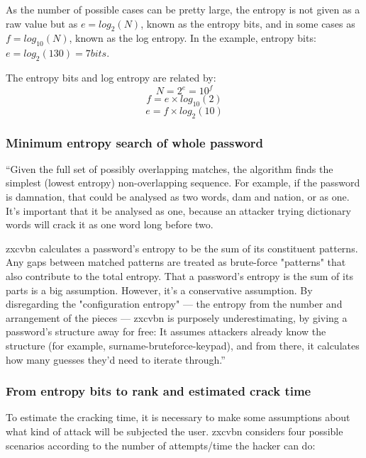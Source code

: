 As the number of possible cases can be pretty large, the entropy is not given as a raw value but as $e = log_{2}(N)$, known as the entropy bits, and in some cases as $f = log_{10}(N)$, known as the log entropy. In the example, entropy bits: $e = log_{2}(130) = 7 bits$.

The entropy bits and log entropy are related by:
\[N = 2^{e} = 10^{f}\]
\[f = e \times log_{10}(2)\]
\[e = f \times log_{2}(10)\]


\subsubsection*{Minimum entropy search of whole password}

``Given the full set of possibly overlapping matches, the algorithm finds the simplest (lowest entropy) non-overlapping sequence. For example, if the password is damnation, that could be analysed as two words, dam and nation, or as one. It’s important that it be analysed as one, because an attacker trying dictionary words will crack it as one word long before two.

zxcvbn calculates a password’s entropy to be the sum of its constituent patterns. Any gaps between matched patterns are treated as brute-force "patterns" that also contribute to the total entropy. That a password’s entropy is the sum of its parts is a big assumption. However, it’s a conservative assumption. By disregarding the "configuration entropy" — the entropy from the number and arrangement of the pieces — zxcvbn is purposely underestimating, by giving a password’s structure away for free: It assumes attackers already know the structure (for example, surname-bruteforce-keypad), and from there, it calculates how many guesses they’d need to iterate through.''\cite{zxdropbox}

\subsubsection*{From entropy bits to rank and estimated crack time} \label{sec:zxLevels}

To estimate the cracking time, it is necessary to make some assumptions about what kind of attack will be subjected the user. zxcvbn considers four possible scenarios according to the number of attempts/time the hacker can do:

